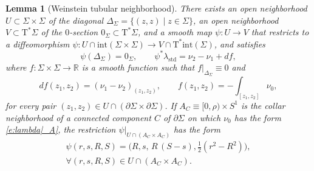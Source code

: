 \documentclass[10pt,a4paper]{article}
\let\mathds\mathbb
\newtheorem{lem}[thm]{Lemma}
\theoremstyle{definition}
\newcommand{\std}{\mathrm{std}}
\newcommand{\Tan}{\mathrm{T}}
\newcommand{\R}{\mathds{R}}
\let\diff d
\begin{document}
\begin{lem}[Weinstein tubular neighborhood]
\label{l:Weinstein}
There exists an open neighborhood $U\subset\Sigma\times\Sigma$ of the diagonal $\Delta_\Sigma=\{(z,z)\mid z\in\Sigma\}$, an open neighborhood \hbox{$V\subset\Tan^*\Sigma$} of the $0$-section $0_\Sigma\subset\Tan^*\Sigma$, and a smooth map $\psi:U\to V$ that restricts to a diffeomorphism $\psi:U\cap\mathrm{int}(\Sigma\times\Sigma)\to V\cap \Tan^* \mathrm{int} (\Sigma)$, and satisfies
\[
\psi(\Delta_\Sigma)=0_\Sigma,
\qquad
\psi^*\lambda_{\std}=\nu_2-\nu_1 + \diff f,
\] where $f:\Sigma\times\Sigma\to\R$ is a smooth function such that $f|_{\Delta_\Sigma}\equiv0$ and
\[
\diff f(z_1,z_2)=(\nu_1-\nu_2)_{(z_1,z_2)},
\qquad
f(z_1,z_2)=-\int_{[z_1,z_2]} \!\!\!\!\!\!\nu_0,
\]
for every pair $(z_1,z_2)\in U\cap(\partial\Sigma\times\partial\Sigma)$.
If $A_C\equiv[0,\rho)\times S^1$ is the collar neighborhood of a connected component $C$ of $\partial\Sigma$ on which $\nu_0$ has the form \eqref{e:lambda|_A}, the restriction $\psi|_{U\cap(A_C\times A_C)}$ has the form
\begin{equation}
\label{psi}
\begin{split}
\psi(r,s,R,S)=\big( R,s,\,R\,(S-s),\tfrac 1 2 (r^2-R^2) \big),
\\
\forall (r,s,R,S)\in U\cap(A_C\times A_C).
\end{split}
\end{equation}
\end{lem}
\end{document}
